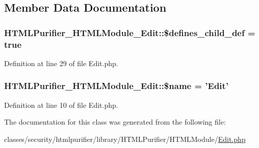 \subsection{Member Data Documentation}
\hypertarget{classHTMLPurifier__HTMLModule__Edit_abaf9668647fcc2e4870d2b354a60d6d5}{
\subsubsection[{\$defines\+\_\+child\+\_\+def}]{\setlength{\rightskip}{0pt plus 5cm}H\+T\+M\+L\+Purifier\+\_\+\+H\+T\+M\+L\+Module\+\_\+\+Edit\+::\$defines\+\_\+child\+\_\+def = true}}\label{classHTMLPurifier__HTMLModule__Edit_abaf9668647fcc2e4870d2b354a60d6d5}


Definition at line 29 of file Edit.\+php.

\hypertarget{classHTMLPurifier__HTMLModule__Edit_af83c8d17bfeaa663ed916d473d14b13e}{
\subsubsection[{\$name}]{\setlength{\rightskip}{0pt plus 5cm}H\+T\+M\+L\+Purifier\+\_\+\+H\+T\+M\+L\+Module\+\_\+\+Edit\+::\$name = 'Edit'}}\label{classHTMLPurifier__HTMLModule__Edit_af83c8d17bfeaa663ed916d473d14b13e}


Definition at line 10 of file Edit.\+php.



The documentation for this class was generated from the following file\+:\begin{DoxyCompactItemize}
\item 
classes/security/htmlpurifier/library/\+H\+T\+M\+L\+Purifier/\+H\+T\+M\+L\+Module/\hyperlink{Edit_8php}{Edit.\+php}\end{DoxyCompactItemize}
